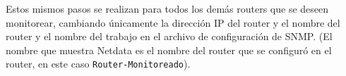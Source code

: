Estos mismos pasos se realizan para todos los demás routers que se deseen monitorear, cambiando únicamente la dirección IP del router y el nombre del router y el nombre del trabajo en el archivo de configuración de SNMP. (El nombre que muestra Netdata es el nombre del router que se configuró en el router, en este caso \texttt{Router-Monitoreado}).
